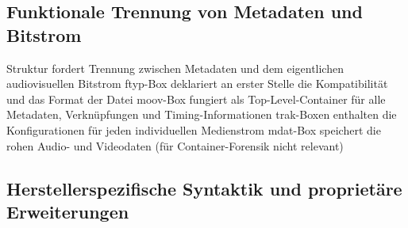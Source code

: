 \subsection{Funktionale Trennung von Metadaten und Bitstrom}

Struktur fordert Trennung zwischen Metadaten und dem eigentlichen audiovisuellen Bitstrom
ftyp-Box deklariert an erster Stelle die Kompatibilität und das Format der Datei
moov-Box fungiert als Top-Level-Container für alle Metadaten, Verknüpfungen und Timing-Informationen
trak-Boxen enthalten die Konfigurationen für jeden individuellen Medienstrom
mdat-Box speichert die rohen Audio- und Videodaten (für Container-Forensik nicht relevant)

\subsection{Herstellerspezifische Syntaktik und proprietäre Erweiterungen}



